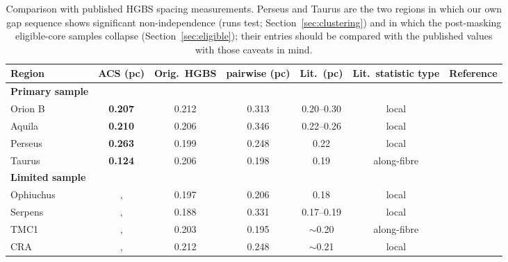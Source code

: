 \documentclass[usenatbib,twoside,twocolumn]{mnras}
\begin{document}
\begin{table}
\caption{Comparison with published HGBS spacing measurements. Perseus and Taurus are the two regions in which our own gap sequence shows significant non-independence (runs test; Section~\ref{sec:clustering}) and in which the post-masking eligible-core samples collapse (Section~\ref{sec:eligible}); their entries should be compared with the published values with those caveats in mind.}
\label{tab:literature}
\setlength{\tabcolsep}{4pt}
\footnotesize
\setlength{\tabcolsep}{2.5pt}
\begin{tabular}{lcccccc}
\toprule
Region & ACS (pc) & Orig.\ HGBS & pairwise (pc) & Lit.\ (pc) & \textbf{Lit.\ statistic type} & Reference \\
\midrule
\textbf{Primary sample} &  &  &  &  &  &  \\
Orion B & \textbf{0.207} & 0.212 & 0.313 & 0.20--0.30 & local & \citet{Konyves2020} \\
Aquila  & \textbf{0.210} & 0.206 & 0.346 & 0.22--0.26 & local & \citet{Konyves2015} \\
Perseus & \textbf{0.263} & 0.199 & 0.248 & 0.22 & local & \citet{Pezzuto2021} \\
Taurus  & \textbf{0.124} & 0.206 & 0.198 & 0.19 & along-fibre & \citet{Hacar2013} \\
\midrule
\textbf{Limited sample} &  &  &  &  &  &  \\
Ophiuchus &, & 0.197 & 0.206 & 0.18 & local & \citet{Konyves2020} \\
Serpens  &, & 0.188 & 0.331 & 0.17--0.19 & local & \citet{Konyves2020} \\
TMC1     &, & 0.203 & 0.195 & $\sim$0.20 & along-fibre & \citet{Hacar2013} \\
CRA      &, & 0.212 & 0.248 & $\sim$0.21 & local & \citet{Konyves2020} \\
\bottomrule
\end{tabular}


\end{table}
\end{document}
